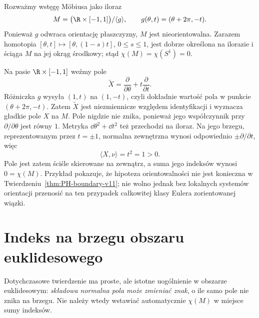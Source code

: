 \begin{przyklad}
\label{prz:PH-mobius-outward-21}
Rozważmy wstęgę Möbiusa jako iloraz
\[
 M=\bigl(\R\times[-1,1]\bigr)/\langle g\rangle,
 \qquad g(\theta,t)=(\theta+2\pi,-t).
\]
Ponieważ $g$ odwraca orientację płaszczyzny,
$M$ jest nieorientowalna. Zarazem homotopia
$[\theta,t]\mapsto[\theta,(1-s)t]$,
$0\leq s\leq1$, jest dobrze określona
na ilorazie i ściąga $M$ na jej okrąg środkowy;
stąd $\chi(M)=\chi(S^1)=0$.

Na pasie $\R\times[-1,1]$ weźmy pole
\[
 \widetilde X=\frac{\partial}{\partial\theta}
                 +t\frac{\partial}{\partial t}.
\]
Różniczka $g$ wysyła
$(1,t)$ na $(1,-t)$, czyli dokładnie
wartość pola w punkcie $(\theta+2\pi,-t)$.
Zatem $\widetilde X$ jest niezmiennicze względem
identyfikacji i wyznacza gładkie pole $X$ na $M$.
Pole nigdzie nie znika, ponieważ jego
współczynnik przy $\partial/\partial\theta$ jest równy $1$.
Metryka $\dd\theta^2+\dd t^2$ też przechodzi na iloraz.
Na jego brzegu, reprezentowanym przez $t=\pm1$,
normalna zewnętrzna wynosi odpowiednio
$\pm\partial/\partial t$, więc
\[
 \langle X,\nu\rangle=t^2=1>0.
\]
Pole jest zatem ściśle skierowane na zewnątrz,
a suma jego indeksów wynosi $0=\chi(M)$.
Przykład pokazuje, że hipoteza orientowalności
nie jest konieczna w
Twierdzeniu~\ref{thm:PH-boundary-v11};
nie wolno jednak bez lokalnych systemów orientacji
przenosić na ten przypadek całkowitej
klasy Eulera zorientowanej wiązki.
\end{przyklad}

\section{Indeks na brzegu obszaru euklidesowego}
\label{sec:stopien-brzegowy-PH-21}

Dotychczasowe twierdzenie ma proste, ale istotne
uogólnienie w obszarze euklidesowym:
\emph{składowa normalna pola może zmieniać znak},
o ile samo pole nie znika na brzegu.
Nie należy wtedy wstawiać automatycznie $\chi(M)$
w miejsce sumy indeksów.

